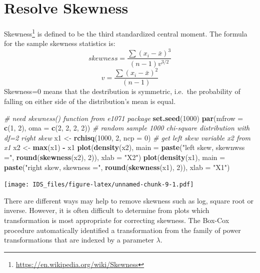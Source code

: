 \documentclass[12pt,]{krantz}
\makeatletter
\newenvironment{Shaded}{\begin{snugshade}}{\end{snugshade}}
\newcommand{\CommentTok}[1]{\textcolor[rgb]{0.37,0.37,0.37}{\textit{#1}}}
\newcommand{\DataTypeTok}[1]{\textcolor[rgb]{0.27,0.27,0.27}{#1}}
\newcommand{\DecValTok}[1]{\textcolor[rgb]{0.06,0.06,0.06}{#1}}
\newcommand{\KeywordTok}[1]{\textcolor[rgb]{0.27,0.27,0.27}{\textbf{#1}}}
\newcommand{\NormalTok}[1]{#1}
\newcommand{\OperatorTok}[1]{\textcolor[rgb]{0.43,0.43,0.43}{\textbf{#1}}}
\newcommand{\StringTok}[1]{\textcolor[rgb]{0.5,0.5,0.5}{#1}}
\renewcommand{\href}[2]{#2\footnote{\url{#1}}}
\newenvironment{kframe}{%
\medskip{}
\setlength{\fboxsep}{.8em}
 \def\at@end@of@kframe{}%
 \ifinner\ifhmode%
  \def\at@end@of@kframe{\end{minipage}}%
  \begin{minipage}{\columnwidth}%
 \fi\fi%
 \def\FrameCommand##1{\hskip\@totalleftmargin \hskip-\fboxsep
 \colorbox{shadecolor}{##1}\hskip-\fboxsep
     \hskip-\linewidth \hskip-\@totalleftmargin \hskip\columnwidth}%
 \MakeFramed {\advance\hsize-\width
   \@totalleftmargin\z@ \linewidth\hsize
   \@setminipage}}%
 {\par\unskip\endMakeFramed%
 \at@end@of@kframe}
\renewenvironment{Shaded}{\begin{kframe}}{\end{kframe}}
\makeatother
\begin{document}
\hypertarget{resolve-skewness}{%
\section{Resolve Skewness}\label{resolve-skewness}}

\href{https://en.wikipedia.org/wiki/Skewness}{Skewness} is defined to be the third standardized central moment. The formula for the sample skewness statistics is:
\[ skewness=\frac{\sum(x_{i}-\bar{x})^{3}}{(n-1)v^{3/2}}\]
\[v=\frac{\sum(x_{i}-\bar{x})^{2}}{(n-1)}\]
Skewness=0 means that the destribution is symmetric, i.e.~the probability of falling on either side of the distribution's mean is equal.

\begin{Shaded}
\begin{Highlighting}[]
\CommentTok{# need skewness() function from e1071 package}
\KeywordTok{set.seed}\NormalTok{(}\DecValTok{1000}\NormalTok{)}
\KeywordTok{par}\NormalTok{(}\DataTypeTok{mfrow =} \KeywordTok{c}\NormalTok{(}\DecValTok{1}\NormalTok{, }\DecValTok{2}\NormalTok{), }\DataTypeTok{oma =} \KeywordTok{c}\NormalTok{(}\DecValTok{2}\NormalTok{, }\DecValTok{2}\NormalTok{, }\DecValTok{2}\NormalTok{, }\DecValTok{2}\NormalTok{))}
\CommentTok{# random sample 1000 chi-square distribution with df=2 right skew}
\NormalTok{x1 <-}\StringTok{ }\KeywordTok{rchisq}\NormalTok{(}\DecValTok{1000}\NormalTok{, }\DecValTok{2}\NormalTok{, }\DataTypeTok{ncp =} \DecValTok{0}\NormalTok{)}
\CommentTok{# get left skew variable x2 from x1}
\NormalTok{x2 <-}\StringTok{ }\KeywordTok{max}\NormalTok{(x1) }\OperatorTok{-}\StringTok{ }\NormalTok{x1}
\KeywordTok{plot}\NormalTok{(}\KeywordTok{density}\NormalTok{(x2), }\DataTypeTok{main =} \KeywordTok{paste}\NormalTok{(}\StringTok{"left skew, skewnwss ="}\NormalTok{, }\KeywordTok{round}\NormalTok{(}\KeywordTok{skewness}\NormalTok{(x2), }
    \DecValTok{2}\NormalTok{)), }\DataTypeTok{xlab =} \StringTok{"X2"}\NormalTok{)}
\KeywordTok{plot}\NormalTok{(}\KeywordTok{density}\NormalTok{(x1), }\DataTypeTok{main =} \KeywordTok{paste}\NormalTok{(}\StringTok{"right skew, skewness ="}\NormalTok{, }\KeywordTok{round}\NormalTok{(}\KeywordTok{skewness}\NormalTok{(x1), }
    \DecValTok{2}\NormalTok{)), }\DataTypeTok{xlab =} \StringTok{"X1"}\NormalTok{)}
\end{Highlighting}
\end{Shaded}

\texttt{[image: IDS\_files/figure-latex/unnamed-chunk-9-1.pdf]}

There are different ways may help to remove skewness such as log, square root or inverse. However, it is often difficult to determine from plots which transformation is most appropriate for correcting skewness. The Box-Cox procedure automatically identified a transformation from the family of power transformations that are indexed by a parameter \(\lambda\)\citep{BOXCOX1}.
\end{document}
